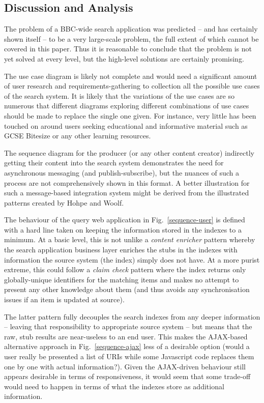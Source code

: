 \documentclass[oribibl]{llncs}
\begin{document}
\subsection{Discussion and Analysis}
\label{appraisal}

The problem of
a BBC-wide search application was predicted --
and has certainly shown itself -- to be a very large-scale problem, the
full extent of which cannot be covered in this paper. Thus it
is reasonable to conclude that the problem is not yet solved
at every level, but the high-level solutions are certainly promising.

The use case diagram is likely not complete and would need
a significant amount of user research and requirements-gathering
to collection all the possible use cases of the search system. It
is likely that the variations of the use cases are so numerous
that different diagrams exploring different combinations of use
cases should be made to replace the single one given. For instance,
very little has been touched on around users seeking educational
and informative material such as GCSE Bitesize or any other
learning resources.

The sequence diagram for the producer (or any other content creator)
indirectly getting their content into the search system demonstrates
the need for asynchronous messaging (and publish-subscribe), but
the nuances of such a process are not comprehensively shown in
this format. A better illustration for such a message-based integration
system might be derived from the illustrated patterns created
by Hohpe and Woolf. \citep{hohpe2004enterprise}

The behaviour of the query web application in Fig.~\ref{sequence-user}
is defined with a hard line
taken on keeping the information stored in the indexes to a minimum.
At a basic level, this is not unlike a \emph{content enricher} pattern
\citep{hohpe2004enterprise} whereby the search application
business layer enriches the stubs in the indexes with information
the source system (the index) simply does not have. At a more purist
extreme, this could follow a \emph{claim check} pattern where
the index returns only globally-unique identifiers for the matching
items and makes no attempt to present any other knowledge about them
(and thus avoids any synchronisation issues if an item is updated at
source).

The latter pattern fully decouples the search indexes from any
deeper information -- leaving that responsibility to appropriate
source system -- but means that the raw, stub results are near-useless
to an end user. This makes the AJAX-based alternative approach
in Fig.~\ref{sequence-ajax}
less of a desirable option (would a user really be presented a list
of URIs while some Javascript code replaces them one by one with
actual information?). Given the AJAX-driven behaviour still appears
desirable in terms of responsiveness, it would seem that some trade-off
would need to happen in terms of what the indexes store as additional
information.
\end{document}
